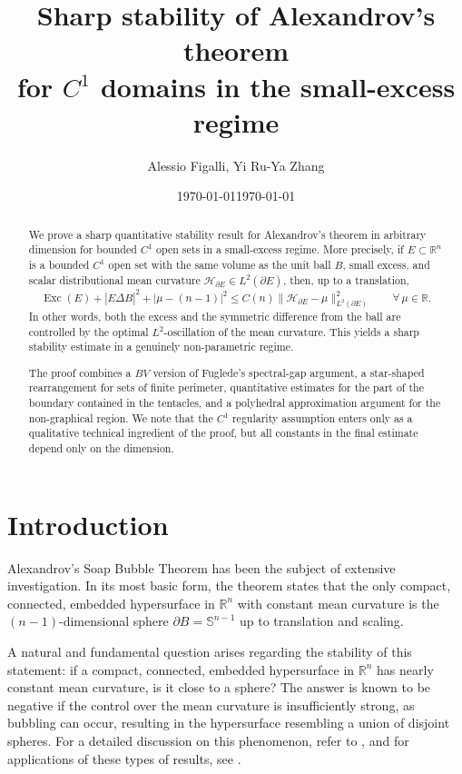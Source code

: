 \documentclass[reqno,11pt]{amsart}
\title[Sharp stability of Alexandrov's theorem for $C^1$ domains]{Sharp stability of Alexandrov's theorem\\ for $C^1$ domains in the small-excess regime}
\author{Alessio Figalli, Yi Ru-Ya Zhang}
\date{\today}
\date{\today}
\numberwithin{equation}{section}
\theoremstyle{remark}
\begin{document}
\begin{abstract}
We prove a sharp quantitative stability result for Alexandrov's theorem in arbitrary dimension for bounded $C^1$ open sets in a small-excess regime. More precisely, if $E\subset \mathbb R^n$ is a bounded $C^1$ open set with the same volume as the unit ball $B$, small excess, and scalar distributional mean curvature $\mathcal H_{\partial E}\in L^2(\partial E)$, then, up to a translation,
$$
\operatorname{Exc}(E)+|E\Delta B|^2+|\mu-(n-1)|^2
\le C(n)\|\mathcal H_{\partial E}-\mu\|_{L^2(\partial E)}^2
\qquad \forall\,\mu\in \mathbb R.
$$
In other words, both the excess and the symmetric difference from the ball are controlled by the optimal $L^2$-oscillation of the mean curvature. This yields a sharp stability estimate in a genuinely non-parametric regime.

The proof combines a $BV$ version of Fuglede's spectral-gap argument, a star-shaped rearrangement for sets of finite perimeter, quantitative estimates for the part of the boundary contained in the tentacles, and a polyhedral approximation argument for the non-graphical region. 
We note that the $C^1$ regularity assumption enters only as a qualitative technical ingredient of the proof, but all constants in the final estimate depend only on the dimension.
\end{abstract}

\maketitle



\section{Introduction}

 

 
Alexandrov's Soap Bubble Theorem has been the subject of extensive investigation. In its most basic form, the theorem states that the only compact, connected, embedded hypersurface in  $\mathbb R^n$ with constant mean curvature is the  $(n-1)$-dimensional sphere $\partial B=\mathbb S^{n-1}$ up to translation and scaling.

A natural and fundamental question arises regarding the stability of this statement: if a compact, connected, embedded hypersurface in $\mathbb R^n$ has nearly constant mean curvature, is it close to a sphere? The answer is known to be negative if the control over the mean curvature is insufficiently strong, as bubbling can occur, resulting in the hypersurface resembling a union of disjoint spheres. For a detailed discussion on this phenomenon, refer to \cite{K1990, K1991, B2011, BM2012, CM2017-2}, and for applications of these types of results, see \cite{S2000, H2014}.
\end{document}
